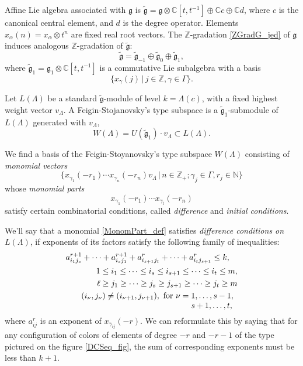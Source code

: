 \documentclass[a4paper, 10pt,oneside]{amsart}
\begin{document}
Affine
Lie algebra associated with ${{\mathfrak g}}$ is ${\tilde{{\mathfrak g}}}={{\mathfrak g}}\otimes
{{\mathbb C}}[t,t^{-1}]\oplus {{\mathbb C}} c \oplus {{\mathbb C}} d$, where $c$ is the canonical
central element, and $d$ is the degree operator. Elements
$x_\alpha(n)=x_\alpha\otimes t^n$ are fixed real root vectors.
The ${{\mathbb Z}}$-gradation \eqref{ZGradG_jed} of ${{\mathfrak g}}$ induces analogous ${{\mathbb Z}}$-gradation of ${\tilde{{\mathfrak g}}}$:
$${\tilde{{\mathfrak g}}}={\tilde{{\mathfrak g}}}_{-1}\oplus {\tilde{{\mathfrak g}}}_0 \oplus {\tilde{{\mathfrak g}}}_1,$$
where ${\tilde{{\mathfrak g}}}_1={{\mathfrak g}}_1\otimes{{\mathbb C}}[t,t^{-1}]$ is a commutative Lie
subalgebra with a basis
$$\{x_\gamma(j)\,|\,j\in{{\mathbb Z}},\gamma\in\Gamma\}.$$

Let $L(\Lambda)$ be a standard ${\tilde{{\mathfrak g}}}$-module of level $k=\Lambda(c)$,
with a fixed highest weight vector $v_\Lambda$. A Feigin-Stojanovsky's
type subspace  is a ${\tilde{{\mathfrak g}}}_1$-submodule of $L(\Lambda)$ generated with
$v_\Lambda$,
$$W(\Lambda)=U({\tilde{{\mathfrak g}}}_1)\cdot v_\Lambda\subset L(\Lambda).$$

We find a basis of the Feigin-Stoyanovsky's type subspace
$W(\Lambda)$ consisting of {\em monomial vectors}
$$\{x_{\gamma_1}(-r_1) \cdots x_{\gamma_n}(-r_n) v_\Lambda\,|\,
n\in{{\mathbb Z}}_+;\gamma_j\in \Gamma, r_j\in{{\mathbb N}}\}$$ whose {\em monomial parts}
\begin{equation}
\label{MonomPart_def} x_{\gamma_1}(-r_1) \cdots x_{\gamma_t}(-r_n)
\end{equation}
satisfy certain combinatorial conditions, called {\em difference}
and {\em initial conditions}.

We'll say that a monomial  \eqref{MonomPart_def} satisfies {\em
difference conditions on} $L(\Lambda)$, if exponents of its factors satisfy the following family of inequalities:
\begin{eqnarray*}
a_{i_1 j_s}^{r+1}+ \dots +a_{i_s j_1}^{r+1}+a_{i_{s+1} j_t}^r+ \dots
+a_{i_t j_{s+1}}^r
\leq k, & & \\
& & \hspace{-58ex} 1\leq i_1 \leq\dots\leq i_s\leq i_{s+1} \leq\dots\leq i_t\leq m, \\
& & \hspace{-58ex}  \ell\geq j_1 \geq\dots\geq j_s \geq j_{s+1}\geq\dots\geq j_t\geq m \\
& & \hspace{-58ex}  (i_\nu,j_\nu)\neq (i_{\nu+1},j_{\nu+1}),\textrm{
for }
\nu=\begin{minipage}[t]{2cm}$1,\dots,s-1,$\\$s+1,\dots,t,$\end{minipage} \nonumber
\end{eqnarray*}
where $a_{ij}^r$ is an exponent of $x_{\gamma_{ij}}(-r)$. We can reformulate this by saying that
for any configuration of colors of elements of degree $-r$ and $-r-1$ of the type pictured on the
figure \ref{DCSeq_fig}, the sum of corresponding exponents must be less than $k+1$.
\end{document}
